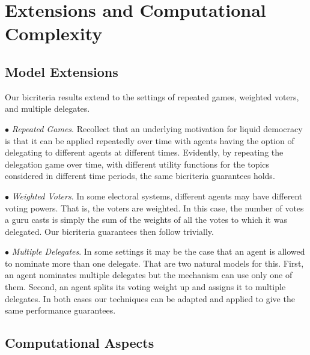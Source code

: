 \section{ Extensions and Computational Complexity}

\subsection{Model Extensions}

Our bicriteria results extend to the settings of repeated games, weighted voters, and multiple delegates.

\noindent $\bullet$ {\em Repeated Games}.
Recollect that an underlying motivation for liquid democracy is that it can be applied repeatedly over time with agents
having the option of delegating to different agents at different times. Evidently, by repeating the delegation
game over time, with different utility functions for the topics considered in different time periods, 
the same bicriteria guarantees holds.

\noindent $\bullet$ {\em Weighted Voters}. In some electoral systems, different agents may have different voting powers.
That is, the voters are weighted. In this case, the number of votes a guru casts is simply the sum of the weights of all the
votes to which it was delegated. Our bicriteria guarantees then follow trivially.

\noindent $\bullet$ {\em Multiple Delegates}.
In some settings it may be the case that an agent is allowed to nominate more than one delegate.
That are two natural models for this. First, an agent nominates multiple delegates but the mechanism
can use only one of them. Second, an agent splits its voting weight up and assigns it to multiple delegates.
In both cases our techniques can be adapted and applied to give the same performance guarantees.


\subsection{Computational Aspects}

